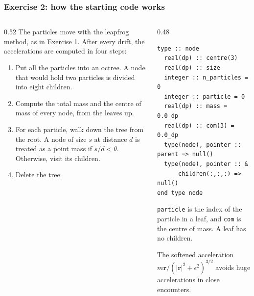 \begin{frame}[fragile]
  \frametitle{Exercise 2: how the starting code works}
  \begin{columns}[T]
    \begin{column}{0.52\textwidth}
      The particles move with the leapfrog method, as in Exercise 1. After every drift, the accelerations are computed in four steps:
      \begin{enumerate}
        \item Put all the particles into an octree. A node that would hold two particles is divided into eight children.
        \item Compute the total mass and the centre of mass of every node, from the leaves up.
        \item For each particle, walk down the tree from the root. A node of size $s$ at distance $d$ is treated as a point mass if $s / d < \theta$. Otherwise, visit its children.
        \item Delete the tree.
      \end{enumerate}
    \end{column}

    \begin{column}{0.48\textwidth}
      \begin{lstlisting}
type :: node
  real(dp) :: centre(3)
  real(dp) :: size
  integer :: n_particles = 0
  integer :: particle = 0
  real(dp) :: mass = 0.0_dp
  real(dp) :: com(3) = 0.0_dp
  type(node), pointer :: parent => null()
  type(node), pointer :: &
      children(:,:,:) => null()
end type node
      \end{lstlisting}
      \footnotesize
      \texttt{particle} is the index of the particle in a leaf, and \texttt{com} is the centre of mass. A leaf has no children.

      \normalsize
      The softened acceleration $m \mathbf{r} / (|\mathbf{r}|^2 + \epsilon^2)^{3/2}$ avoids huge accelerations in close encounters.
    \end{column}
  \end{columns}
\end{frame}


